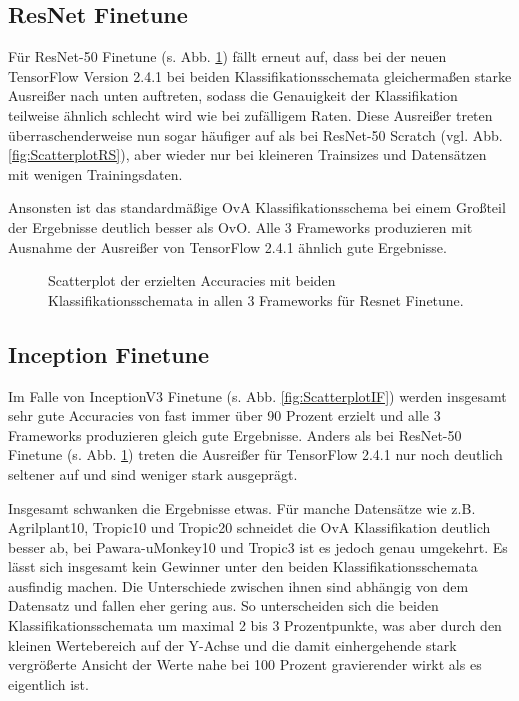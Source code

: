 \subsection{ResNet Finetune}
Für ResNet-50 Finetune (s. Abb. \ref{fig:ScatterplotRF}) fällt erneut auf, dass bei der neuen TensorFlow \cite{tensorflow} Version 2.4.1 bei beiden Klassifikationsschemata gleichermaßen starke Ausreißer nach unten auftreten, sodass die Genauigkeit der Klassifikation teilweise ähnlich schlecht wird wie bei zufälligem Raten. Diese Ausreißer treten überraschenderweise nun sogar häufiger auf als bei ResNet-50 Scratch (vgl. Abb. \ref{fig:ScatterplotRS}), aber wieder nur bei kleineren Trainsizes und Datensätzen mit wenigen Trainingsdaten.

Ansonsten ist das standardmäßige OvA Klassifikationsschema bei einem Großteil der Ergebnisse deutlich besser als OvO. Alle 3 Frameworks produzieren mit Ausnahme der Ausreißer von TensorFlow 2.4.1 \cite{tensorflow} ähnlich gute Ergebnisse.
\begin{figure}[H]
\begin{adjustbox}{width=\textwidth, center}

\end{adjustbox}
\caption{Scatterplot der erzielten Accuracies mit beiden Klassifikationsschemata in allen 3 Frameworks für Resnet Finetune.}
\label{fig:ScatterplotRF}
\end{figure}
\newpage
\subsection{Inception Finetune}
Im Falle von InceptionV3 Finetune (s. Abb. \ref{fig:ScatterplotIF}) werden insgesamt sehr gute Accuracies von fast immer über 90 Prozent erzielt und alle 3 Frameworks produzieren gleich gute Ergebnisse. Anders als bei ResNet-50 Finetune (s. Abb. \ref{fig:ScatterplotRF}) treten die Ausreißer für TensorFlow 2.4.1 \cite{tensorflow} nur noch deutlich seltener auf und sind weniger stark ausgeprägt.

Insgesamt schwanken die Ergebnisse etwas. Für manche Datensätze wie z.B. Agrilplant10, Tropic10 und Tropic20 schneidet die OvA Klassifikation deutlich besser ab, bei Pawara-uMonkey10 und Tropic3 ist es jedoch genau umgekehrt.
Es lässt sich insgesamt kein Gewinner unter den beiden Klassifikationsschemata ausfindig machen. Die Unterschiede zwischen ihnen sind abhängig von dem Datensatz und fallen eher gering aus. So unterscheiden sich die beiden Klassifikationsschemata um maximal 2 bis 3 Prozentpunkte, was aber durch den kleinen Wertebereich auf der Y-Achse und die damit einhergehende stark vergrößerte Ansicht der Werte nahe bei 100 Prozent gravierender wirkt als es eigentlich ist.

